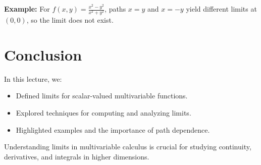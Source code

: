 \documentclass{article}
\begin{document}
\textbf{Example:}
For $f(x, y) = \frac{x^2 - y^2}{x^2 + y^2}$, paths $x = y$ and $x = -y$ yield different limits at $(0, 0)$, so the limit does not exist.

\section*{Conclusion}

In this lecture, we:
\begin{itemize}
  \item Defined limits for scalar-valued multivariable functions.
  \item Explored techniques for computing and analyzing limits.
  \item Highlighted examples and the importance of path dependence.
\end{itemize}

Understanding limits in multivariable calculus is crucial for studying continuity, derivatives, and integrals in higher dimensions.
\end{document}
